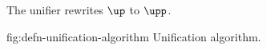 \documentclass[acmsmall,screen,nonacm,review]{acmart}
\begin{document}
\judgbox{\up \unif \upp}
  {The unifier rewrites $\up$ to $\upp$.}
\begin{mathparfig}[htpb!]
  {fig:defn-unification-algorithm}
  {Unification algorithm.}
   \rewrite[U-Exists]
      {(\cexists \alpha \upa) \cand \upb \\ \tv \disjoint \upb}
      {\cexists \tv {\upa \cand \upb}}

    \rewrite[U-Cycle]
      {\up \\ \cyclic \up}
      {\cfalse}

    \rewrite[U-True]
      {\up \cand \ctrue}
      {\up}

    \rewrite[U-False]
      {\up \cand \cfalse}
      {\cfalse}

    \rewrite[U-Merge]
      {\cunif \tv \ueqa \cand \cunif \tv \ueqb}
      {\cunif \tv {\cunif \ueqa \ueqb}}

    \rewrite[U-Stutter]
      {\cunif \tv {\cunif \tv \ueq}}
      {\cunif \tv \ueq}

    \rewrite[U-Name]
      {\cunif {\pshapp \tys[\ti]} \ueq \\ \tv \disjoint \tys, \ueq }
      {\cexists \tv {\cunif \tv \ti \cand \cunif {\pshapp \tys[\tv] } \ueq}}

    \rewrite[U-Decomp]
      {\cunif {\pshapp \tvs} {\cunif {\pshapp \tvbs} \ueq}}
      {\cunif {\pshapp \tvs} \ueq \cand \cunif \tvs \tvbs}

    \rewrite[U-Clash]
      {\cunif {\pshapp \tvs} {\cunif {\pshapp[\shp]\tvbs } \ueq }\\
       \sh \neq \shp}
      {\cfalse}

    \rewrite[U-Trivial]
      {\trivial \ueq}
      {\ctrue}
\end{mathparfig}
\FloatBarrier
\end{document}

